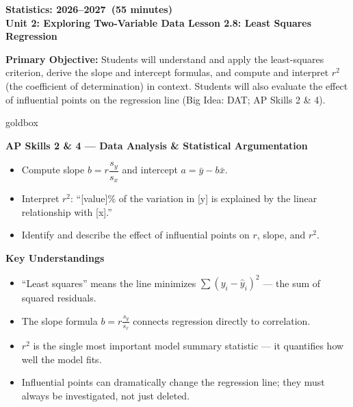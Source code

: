 \documentclass[10pt]{article}
\newcommand{\CourseName}{Statistics}
\newcommand{\SchoolYear}{2026--2027}
\newcommand{\MeetingLength}{55 minutes}
\newcommand{\UnitNumberName}{Unit 2: Exploring Two-Variable Data \quad}
\newcommand{\LessonNumberName}{Lesson 2.8: Least Squares Regression}
\begin{document}
\begin{center}
    {\Large\bfseries \CourseName: \SchoolYear\ (\MeetingLength) \\
    {\small\bfseries \UnitNumberName \LessonNumberName}}
\end{center}

\begin{tcolorbox}[colback=sky,colframe=navy,boxrule=0.9pt,arc=2mm,
    left=2mm,right=2mm,top=1.5mm,bottom=1.5mm]
    \textbf{Primary Objective:} Students will understand and apply the least-squares criterion,
    derive the slope and intercept formulas, and compute and interpret $r^2$ (the coefficient of
    determination) in context. Students will also evaluate the effect of influential points on the
    regression line (Big Idea: DAT; AP Skills 2 \& 4).
\end{tcolorbox}

\begin{skillbox}{goldbox}
\begin{minipage}[t]{0.48\linewidth}
    \textbf{AP Skills 2 \& 4 --- Data Analysis \& Statistical Argumentation}
    \begin{itemize}
        \item Compute slope $b = r\dfrac{s_y}{s_x}$ and intercept $a = \bar{y} - b\bar{x}$.
        \item Interpret $r^2$: ``[value]\% of the variation in [y] is explained by the linear relationship with [x].''
        \item Identify and describe the effect of influential points on $r$, slope, and $r^2$.
    \end{itemize}
\end{minipage}
\hfill
\begin{minipage}[t]{0.48\linewidth}
    \textbf{Key Understandings}
    \begin{itemize}
        \item ``Least squares'' means the line minimizes $\sum(y_i - \hat{y}_i)^2$ --- the sum of squared residuals.
        \item The slope formula $b = r\frac{s_y}{s_x}$ connects regression directly to correlation.
        \item $r^2$ is the single most important model summary statistic --- it quantifies how well the model fits.
        \item Influential points can dramatically change the regression line; they must always be investigated, not just deleted.
    \end{itemize}
\end{minipage}
\end{skillbox}
\end{document}
